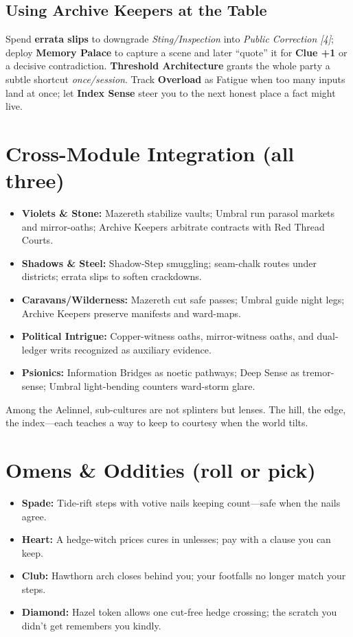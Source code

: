 \documentclass[11pt]{book}
\begin{document}
\subsection*{Using Archive Keepers at the Table}
Spend \textbf{errata slips} to downgrade \emph{Sting/Inspection} into \emph{Public Correction [4]}; deploy \textbf{Memory Palace} to capture a scene and later ``quote'' it for \textbf{Clue +1} or a decisive contradiction. \textbf{Threshold Architecture} grants the whole party a subtle shortcut \emph{once/session}. Track \textbf{Overload} as Fatigue when too many inputs land at once; let \textbf{Index Sense} steer you to the next honest place a fact might live.

\section{Cross-Module Integration (all three)}
\begin{itemize}
    \item \textbf{Violets \& Stone:} Mazereth stabilize vaults; Umbral run parasol markets and mirror-oaths; Archive Keepers arbitrate contracts with Red Thread Courts.
    \item \textbf{Shadows \& Steel:} Shadow-Step smuggling; seam-chalk routes under districts; errata slips to soften crackdowns.
    \item \textbf{Caravans/Wilderness:} Mazereth cut safe passes; Umbral guide night legs; Archive Keepers preserve manifests and ward-maps.
    \item \textbf{Political Intrigue:} Copper-witness oaths, mirror-witness oaths, and dual-ledger writs recognized as auxiliary evidence.
    \item \textbf{Psionics:} Information Bridges as noetic pathways; Deep Sense as tremor-sense; Umbral light-bending counters ward-storm glare.
\end{itemize}

Among the Aelinnel, sub-cultures are not splinters but lenses. The hill, the edge, the index---each teaches a way to keep to courtesy when the world tilts.

\section*{Omens \& Oddities (roll or pick)}
\begin{itemize}
    \item \textbf{Spade:} Tide-rift steps with votive nails keeping count---safe when the nails agree.
    \item \textbf{Heart:} A hedge-witch prices cures in unlesses; pay with a clause you can keep.
    \item \textbf{Club:} Hawthorn arch closes behind you; your footfalls no longer match your steps.
    \item \textbf{Diamond:} Hazel token allows one cut-free hedge crossing; the scratch you didn't get remembers you kindly.
\end{itemize}
\end{document}
